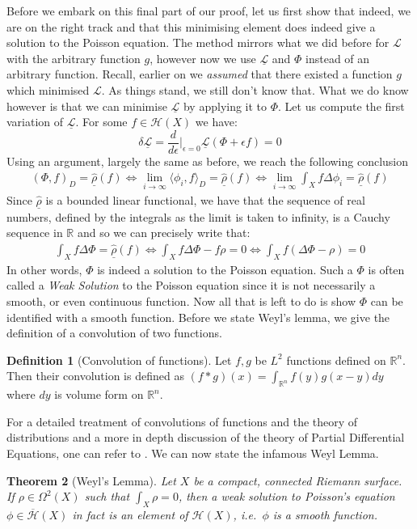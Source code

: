 \documentclass[11pt]{report}
\newtheorem{thm}{Theorem}[section]
\theoremstyle{definition}
\newtheorem{defn}[thm]{Definition}
\begin{document}
Before we embark on this final part of our proof, let us first show that indeed, we are on the right track and that this minimising element does indeed give a solution to the Poisson equation. The method mirrors what we did before for $\mathcal{L}$ with the arbitrary function $g$, however now we use $\underline{\mathcal{L}}$ and $\Phi$ instead of an arbitrary function. Recall, earlier on we \emph{assumed} that there existed a function $g$ which minimised $\mathcal{L}$. As things stand, we still don't know that. What we do know however is that we can minimise $\underline{\mathcal{L}}$ by applying it to $\Phi$. Let us compute the first variation of $\underline{\mathcal{L}}$. For some $f\in \mathcal{H}(X)$ we have:
 \[ \delta\underline{\mathcal{L}} =  \frac{d}{d\epsilon}\biggr\rvert_{\epsilon = 0} \underline{\mathcal{L}}(\Phi + \epsilon f) = 0\]
Using an argument, largely the same as before, we reach the following conclusion
\begin{align*}
  (\Phi,f)_D = \underline{\hat{\rho}}(f) \Longleftrightarrow
  \lim_{i \rightarrow \infty}\langle \phi_i,f\rangle_D = \underline{\hat{\rho}}(f) \Longleftrightarrow
  \lim_{i \rightarrow \infty}\int_X f \Delta \phi_i = \underline{\hat{\rho}}(f) 
\end{align*}
Since $\underline{\hat{\rho}}$ is a bounded linear functional, we have that the sequence of real numbers, defined by the integrals as the limit is taken to infinity, is a Cauchy sequence in $\mathbb{R}$ and so we can precisely write that:
\begin{align*} 
  \int_X f\Delta\Phi = \underline{\hat{\rho}}(f) \Longleftrightarrow
  \int_X f\Delta\Phi - f\rho = 0 \Longleftrightarrow
  \int_X f(\Delta\Phi - \rho) = 0
\end{align*}
In other words, $\Phi$ is indeed a solution to the Poisson equation. Such a $\Phi$ is often called a \emph{Weak Solution} to the Poisson equation since it is not necessarily a smooth, or even continuous function.
Now all that is left to do is show $\Phi$ can be identified with a smooth function. Before we state Weyl's lemma, we give the definition of a convolution of two functions.
\begin{defn}[Convolution of functions]\label{ConvolutionDefn}
  Let $f,g$ be $L^2$ functions defined on $\mathbb{R}^n$. Then their convolution is defined as $(f * g)(x) = \int_{\mathbb{R}^n}f(y)g(x-y)dy$ where $dy$ is volume form on $\mathbb{R}^n$.
\end{defn}
For a detailed treatment of convolutions of functions and the theory of distributions and a more in depth discussion of the theory of Partial Differential Equations, one can refer to \cite[Chapter 6]{rudin}. We can now state the infamous Weyl Lemma.
\begin{thm}[Weyl's Lemma]\label{WeylsLemmaCompact}
  Let $X$ be a compact, connected Riemann surface. If $\rho \in \Omega^2(X)$ such that $\int_X \rho = 0$, then a weak solution to Poisson's equation $\phi \in \overline{\mathcal{H}}(X)$ in fact is an element of $\mathcal{H}(X)$, i.e.\ $\phi$ is a smooth function.
\end{thm}
\end{document}
